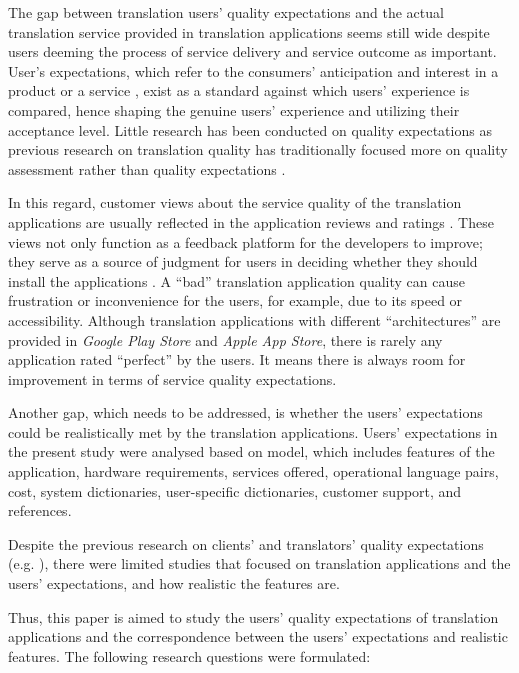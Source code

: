 \documentclass[english]{textolivre}
\begin{document}
The gap between translation users’ quality expectations and the actual translation service provided in translation applications seems still wide despite users deeming the process of service delivery and service outcome as important. User’s expectations, which refer to the consumers’ anticipation and interest in a product or a service \cite{kaasinen_user-centric_2012}, exist as a standard against which users’ experience is compared, hence shaping the genuine users’ experience and utilizing their acceptance level. Little research has been conducted on quality expectations as previous research on translation quality has traditionally focused more on quality assessment rather than quality expectations \cite{house_translation_2014}.

In this regard, customer views about the service quality of the translation applications are usually reflected in the application reviews and ratings \cite{koby_defining_2014}. These views not only function as a feedback platform for the developers to improve; they serve as a source of judgment for users in deciding whether they should install the applications \cite{thakur_customer_2018}. A “bad” translation application quality can cause frustration or inconvenience for the users, for example, due to its speed or accessibility. Although translation applications with different “architectures” \cite{jimenez_crespo_mobile_2016} are provided in \textit{Google Play Store} and \textit{Apple App Store}, there is rarely any application rated “perfect” by the users. It means there is always room for improvement in terms of service quality expectations.

Another gap, which needs to be addressed, is whether the users’ expectations could be realistically met by the translation applications. Users’ expectations in the present study were analysed based on  model, which includes features of the application, hardware requirements, services offered, operational language pairs, cost, system dictionaries, user-specific dictionaries, customer support, and references.

Despite the previous research on clients’ and translators’ quality expectations (e.g. \textcite{way_quality_2018}), there were limited studies that focused on translation applications and the users’ expectations, and how realistic the features are.

Thus, this paper is aimed to study the users’ quality expectations of translation applications and the correspondence between the users’ expectations and realistic features. The following research questions were formulated:
\end{document}
